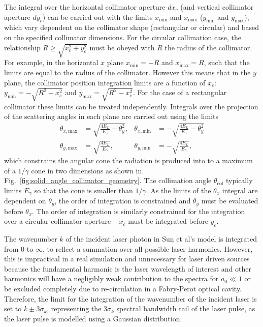 \documentclass[../main.tex]{subfiles}
\begin{document}
The integral over the horizontal collimator aperture $dx_{c}$ (and vertical collimator aperture $dy_{c}$) can be carried out with the limits $x_{\mathrm{min}}$ and $x_{\mathrm{max}}$ ($y_{\mathrm{min}}$ and $y_{\mathrm{max}}$), which vary dependent on the collimator shape (rectangular or circular) and based on the specified collimator dimensions. For the circular collimation case, the relationship $R\geq\sqrt{x_{c}^{2}+y_{c}^{2}}$ must be obeyed with $R$ the radius of the collimator. For example, in the horizontal $x$ plane $x_{\mathrm{min}} = -R$ and $x_{\mathrm{max}} = R$, such that the limits are equal to the radius of the collimator. However this means that in the $y$ plane, the collimator position integration limits are a function of $x_{c}$: $y_{\mathrm{min}} = -\sqrt{R^{2}-x_{c}^{2}}$ and $y_{\mathrm{max}} = \sqrt{R^{2}-x_{c}^{2}}$. For the case of a rectangular collimator these limits can be treated independently.  
Integrals over the projection of the scattering angles in each plane are carried out using the limits
\begin{align}
\theta_{x,\mathrm{max}} &= \sqrt{\frac{4E_{L}}{E_{\gamma}}-\theta_{y}^{2}}, & \theta_{x,\mathrm{min}} &= -\sqrt{\frac{4E_{L}}{E_{\gamma}}-\theta_{y}^{2}} \nonumber\\ 
\theta_{y,\mathrm{max}} &= \sqrt{\frac{4E_{L}}{E_{\gamma}}}, & \theta_{y,\mathrm{min}} &= -\sqrt{\frac{4E_{L}}{E_{\gamma}}},  
\end{align}
which constrains the angular cone the radiation is produced into to a maximum of a $1/\gamma$ cone in two dimensions as shown in Fig.~\ref{fig:solid_angle_collimator_geometry}. The collimation angle $\theta_{\mathrm{col}}$ typically limits $E_{\gamma}$ so that the cone is smaller than $1/\gamma$. As the limits of the $\theta_{x}$ integral are dependent on $\theta_{y}$, the order of integration is constrained and $\theta_{y}$ must be evaluated before $\theta_{x}$. The order of integration is similarly constrained for the integration over a circular collimator aperture -- $x_{c}$ must be integrated before $y_{c}$.

The wavenumber $k$ of the incident laser photon in Sun et al's model \cite{sun2009characterizations,sun2011theoretical} is integrated from $0$ to $\infty$, to reflect a summation over all possible laser harmonics. However, this is impractical in a real simulation and unnecessary for laser driven sources because the fundamental harmonic is the laser wavelength of interest and other harmonics will have a negligibly weak contribution to the spectra for $a_{0} \ll 1$ or be excluded completely due to re-circulation in a Fabry-Perot optical cavity. Therefore, the limit for the integration of the wavenumber of the incident laser is set to $k\pm3\sigma_{k}$, representing the 3$\sigma_{k}$ spectral bandwidth tail of the laser pulse, as the laser pulse is modelled using a Gaussian distribution.  
\end{document}

